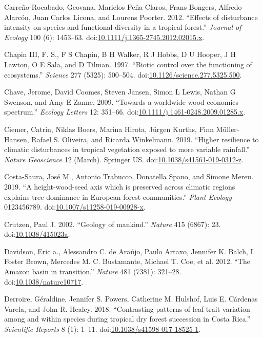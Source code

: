\documentclass[]{elsarticle} %
\begin{document}
\hypertarget{ref-Carreno-Rocabado2012}{}
Carreño-Rocabado, Geovana, Marielos Peña-Claros, Frans Bongers, Alfredo
Alarcón, Juan Carlos Licona, and Lourens Poorter. 2012. ``Effects of
disturbance intensity on species and functional diversity in a tropical
forest.'' \emph{Journal of Ecology} 100 (6): 1453--63.
doi:\href{https://doi.org/10.1111/j.1365-2745.2012.02015.x}{10.1111/j.1365-2745.2012.02015.x}.

\hypertarget{ref-ChapinIII1997}{}
Chapin III, F. S., F S Chapin, B H Walker, R J Hobbs, D U Hooper, J H
Lawton, O E Sala, and D Tilman. 1997. ``Biotic control over the
functioning of ecosystems.'' \emph{Science} 277 (5325): 500--504.
doi:\href{https://doi.org/10.1126/science.277.5325.500}{10.1126/science.277.5325.500}.

\hypertarget{ref-Chave2009}{}
Chave, Jerome, David Coomes, Steven Jansen, Simon L Lewis, Nathan G
Swenson, and Amy E Zanne. 2009. ``Towards a worldwide wood economics
spectrum.'' \emph{Ecology Letters} 12: 351--66.
doi:\href{https://doi.org/10.1111/j.1461-0248.2009.01285.x}{10.1111/j.1461-0248.2009.01285.x}.

\hypertarget{ref-Ciemer2019}{}
Ciemer, Catrin, Niklas Boers, Marina Hirota, Jürgen Kurths, Finn
Müller-Hansen, Rafael S. Oliveira, and Ricarda Winkelmann. 2019.
``Higher resilience to climatic disturbances in tropical vegetation
exposed to more variable rainfall.'' \emph{Nature Geoscience} 12
(March). Springer US.
doi:\href{https://doi.org/10.1038/s41561-019-0312-z}{10.1038/s41561-019-0312-z}.

\hypertarget{ref-Costa-Saura2019}{}
Costa-Saura, José M., Antonio Trabucco, Donatella Spano, and Simone
Mereu. 2019. ``A height-wood-seed axis which is preserved across
climatic regions explains tree dominance in European forest
communities.'' \emph{Plant Ecology} 0123456789.
doi:\href{https://doi.org/10.1007/s11258-019-00928-x}{10.1007/s11258-019-00928-x}.

\hypertarget{ref-Crutzen2002}{}
Crutzen, Paul J. 2002. ``Geology of mankind.'' \emph{Nature} 415 (6867):
23. doi:\href{https://doi.org/10.1038/415023a}{10.1038/415023a}.

\hypertarget{ref-Davidson2012}{}
Davidson, Eric a., Alessandro C. de Araújo, Paulo Artaxo, Jennifer K.
Balch, I. Foster Brown, Mercedes M. C. Bustamante, Michael T. Coe, et
al. 2012. ``The Amazon basin in transition.'' \emph{Nature} 481 (7381):
321--28.
doi:\href{https://doi.org/10.1038/nature10717}{10.1038/nature10717}.

\hypertarget{ref-Derroire2018}{}
Derroire, Géraldine, Jennifer S. Powers, Catherine M. Hulshof, Luis E.
Cárdenas Varela, and John R. Healey. 2018. ``Contrasting patterns of
leaf trait variation among and within species during tropical dry forest
succession in Costa Rica.'' \emph{Scientific Reports} 8 (1): 1--11.
doi:\href{https://doi.org/10.1038/s41598-017-18525-1}{10.1038/s41598-017-18525-1}.
\end{document}
